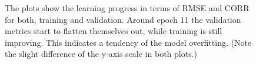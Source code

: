 \begin{figure}[htbp]
  \centering
  \hfill
  \caption[Training cures of the proposed approach]{The plots show the learning progress in terms of RMSE and CORR for both, training and validation. Around epoch 11 the validation metrics start to flatten themselves out, while training is still improving. This indicates a tendency of the model overfitting. (Note the slight difference of the y-axis scale in both plots.)}
  \label{fig:LearningCurveResults}
\end{figure}

